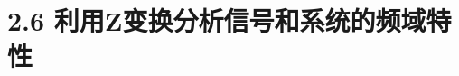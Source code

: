 \documentclass[notheorems,compress,mathserif,table]{beamer}
\begin{document}
%
%
%
%
%
%


\section{2.6 利用Z变换分析信号和系统的频域特性}
\end{document}
